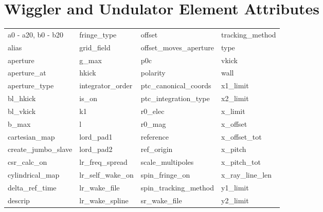  \section{Wiggler and Undulator Element Attributes}
 \label{s:list.wiggler}
 
 \begin{tabular}{llll} \toprule
a0 - a20, b0 - b20          & fringe_type                 & offset                      & tracking_method             \\
alias                       & grid_field                  & offset_moves_aperture       & type                        \\
aperture                    & g_max                       & p0c                         & vkick                       \\
aperture_at                 & hkick                       & polarity                    & wall                        \\
aperture_type               & integrator_order            & ptc_canonical_coords        & x1_limit                    \\
bl_hkick                    & is_on                       & ptc_integration_type        & x2_limit                    \\
bl_vkick                    & k1                          & r0_elec                     & x_limit                     \\
b_max                       & l                           & r0_mag                      & x_offset                    \\
cartesian_map               & lord_pad1                   & reference                   & x_offset_tot                \\
create_jumbo_slave          & lord_pad2                   & ref_origin                  & x_pitch                     \\
csr_calc_on                 & lr_freq_spread              & scale_multipoles            & x_pitch_tot                 \\
cylindrical_map             & lr_self_wake_on             & spin_fringe_on              & x_ray_line_len              \\
delta_ref_time              & lr_wake_file                & spin_tracking_method        & y1_limit                    \\
descrip                     & lr_wake_spline              & sr_wake_file                & y2_limit                    \\

\end{tabular}
